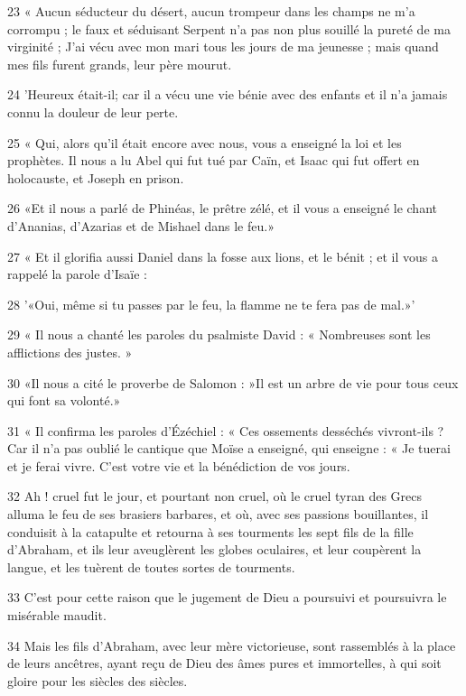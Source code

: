 \par 23 « Aucun séducteur du désert, aucun trompeur dans les champs ne m'a corrompu ; le faux et séduisant Serpent n’a pas non plus souillé la pureté de ma virginité ; J'ai vécu avec mon mari tous les jours de ma jeunesse ; mais quand mes fils furent grands, leur père mourut.

\par 24 'Heureux était-il; car il a vécu une vie bénie avec des enfants et il n'a jamais connu la douleur de leur perte.

\par 25 « Qui, alors qu'il était encore avec nous, vous a enseigné la loi et les prophètes. Il nous a lu Abel qui fut tué par Caïn, et Isaac qui fut offert en holocauste, et Joseph en prison.

\par 26 «Et il nous a parlé de Phinéas, le prêtre zélé, et il vous a enseigné le chant d'Ananias, d'Azarias et de Mishael dans le feu.»

\par 27 « Et il glorifia aussi Daniel dans la fosse aux lions, et le bénit ; et il vous a rappelé la parole d'Isaïe :

\par 28 '«Oui, même si tu passes par le feu, la flamme ne te fera pas de mal.»'

\par 29 « Il nous a chanté les paroles du psalmiste David : « Nombreuses sont les afflictions des justes. »

\par 30 «Il nous a cité le proverbe de Salomon : »Il est un arbre de vie pour tous ceux qui font sa volonté.»

\par 31 « Il confirma les paroles d'Ézéchiel : « Ces ossements desséchés vivront-ils ? Car il n’a pas oublié le cantique que Moïse a enseigné, qui enseigne : « Je tuerai et je ferai vivre. C'est votre vie et la bénédiction de vos jours.

\par 32 Ah ! cruel fut le jour, et pourtant non cruel, où le cruel tyran des Grecs alluma le feu de ses brasiers barbares, et où, avec ses passions bouillantes, il conduisit à la catapulte et retourna à ses tourments les sept fils de la fille d'Abraham, et ils leur aveuglèrent les globes oculaires, et leur coupèrent la langue, et les tuèrent de toutes sortes de tourments.

\par 33 C'est pour cette raison que le jugement de Dieu a poursuivi et poursuivra le misérable maudit.

\par 34 Mais les fils d'Abraham, avec leur mère victorieuse, sont rassemblés à la place de leurs ancêtres, ayant reçu de Dieu des âmes pures et immortelles, à qui soit gloire pour les siècles des siècles.


